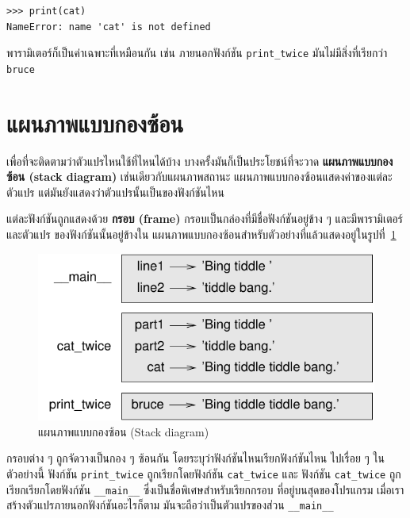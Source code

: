 \begin{verbatim}
>>> print(cat)
NameError: name 'cat' is not defined
\end{verbatim}
%
พารามิเตอร์ก็เป็นค่าเฉพาะที่เหมือนกัน เช่น ภายนอกฟังก์ชัน \verb|print_twice|
มันไม่มีสิ่งที่เรียกว่า {\tt bruce}


\section{แผนภาพแบบกองซ้อน} %
\label{stackdiagram}

เพื่อที่จะติดตามว่าตัวแปรไหนใช้ที่ไหนได้บ้าง บางครั้งมันก็เป็นประโยชน์ที่จะวาด {\bf แผนภาพแบบกองซ้อน (stack diagram)}
เช่นเดียวกับแผนภาพสถานะ แผนภาพแบบกองซ้อนแสดงค่าของแต่ละตัวแปร แต่มันยังแสดงว่าตัวแปรนั้นเป็นของฟังก์ชันไหน 

แต่ละฟังก์ชันถูกแสดงด้วย {\bf กรอบ (frame)} กรอบเป็นกล่องที่มีชื่อฟังก์ชันอยู่ข้าง ๆ และมีพารามิเตอร์และตัวแปร
ของฟังก์ชันนั้นอยู่ข้างใน แผนภาพแบบกองซ้อนสำหรับตัวอย่างที่แล้วแสดงอยู่ในรูปที่~\ref{fig.stack} 

\begin{figure}
\centerline
{\includegraphics[scale=0.8]{figs/stack.pdf}}
\caption{แผนภาพแบบกองซ้อน (Stack diagram)}
\label{fig.stack}
\end{figure}


กรอบต่าง ๆ ถูกจัดวางเป็นกอง ๆ ซ้อนกัน โดยระบุว่าฟังก์ชันไหนเรียกฟังก์ชันไหน ไปเรื่อย ๆ
ในตัวอย่างนี้ ฟังก์ชัน \verb|print_twice| ถูกเรียกโดยฟังก์ชัน \verb|cat_twice| และ
ฟังก์ชัน \verb|cat_twice| ถูกเรียกเรียกโดยฟังก์ชัน \verb|__main__| ซึ่งเป็นชื่อพิเศษสำหรับเรียกกรอบ
ที่อยู่บนสุดของโปรแกรม เมื่อเราสร้างตัวแปรภายนอกฟังก์ชันอะไรก็ตาม มันจะถือว่าเป็นตัวแปรของส่วน \verb"__main__"

